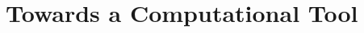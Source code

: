 \documentclass[../Dissertation.tex]{subfiles}
\begin{document}
\section{Towards a Computational Tool}\label{sec:towardsatool}





\end{document}
